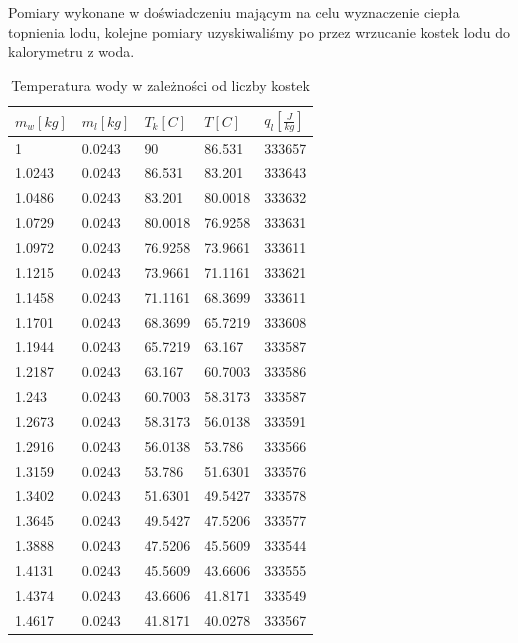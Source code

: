 \documentclass{article}
\begin{document}
Pomiary wykonane w doświadczeniu mającym na celu wyznaczenie ciepła topnienia lodu, kolejne pomiary uzyskiwaliśmy po przez wrzucanie kostek lodu do kalorymetru z woda.
\begin{table}[h!]
\centering
\begin{tabular}{|l|l|l|l|l|}
\hline
$m_w [kg]$ & $m_l [kg]$ & $T_k [C]$ & $T [C]$ & $q_l[\frac{J}{kg}]$ \\ \hline
1      & 0.0243 & 90      & 86.531              & 333657        \\
1.0243 & 0.0243 & 86.531  & 83.201              & 333643           \\
1.0486 & 0.0243 & 83.201  & 80.0018             & 333632      \\
1.0729 & 0.0243 & 80.0018 & 76.9258             & 333631       \\
1.0972 & 0.0243 & 76.9258 & 73.9661             & 333611        \\
1.1215 & 0.0243 & 73.9661 & 71.1161             & 333621      \\
1.1458 & 0.0243 & 71.1161 & 68.3699             & 333611      \\
1.1701 & 0.0243 & 68.3699 & 65.7219             & 333608      \\
1.1944 & 0.0243 & 65.7219 & 63.167              & 333587       \\
1.2187 & 0.0243 & 63.167  & 60.7003             & 333586       \\
1.243  & 0.0243 & 60.7003 & 58.3173             & 333587    \\
1.2673 & 0.0243 & 58.3173 & 56.0138             & 333591\\
1.2916 & 0.0243 & 56.0138 & 53.786              & 333566\\
1.3159 & 0.0243 & 53.786  & 51.6301             & 333576\\
1.3402 & 0.0243 & 51.6301 & 49.5427             & 333578 \\
1.3645 & 0.0243 & 49.5427 & 47.5206             & 333577 \\
1.3888 & 0.0243 & 47.5206 & 45.5609             & 333544 \\
1.4131 & 0.0243 & 45.5609 & 43.6606             & 333555\\
1.4374 & 0.0243 & 43.6606 & 41.8171             & 333549\\
1.4617 & 0.0243 & 41.8171 & 40.0278             & 333567\\
\hline
\end{tabular}
\caption{Temperatura wody w zależności od liczby kostek}
\end{table}
\end{document}
